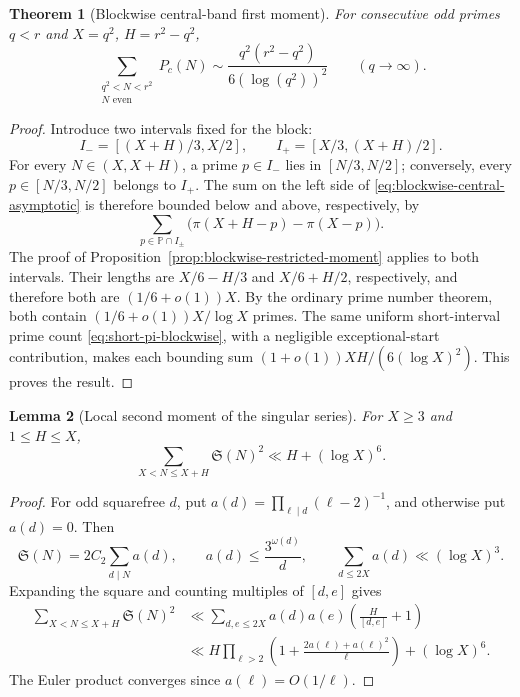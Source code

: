 \documentclass[final,11pt]{elsarticle}
\newtheorem{theorem}{Theorem}[section]
\newtheorem{lemma}[theorem]{Lemma}
\theoremstyle{definition}
\theoremstyle{remark}
\newcommand{\PP}{\mathbb{P}}
\newcommand{\Sg}{\mathfrak{S}}
\numberwithin{equation}{section}
\begin{document}
\begin{theorem}[Blockwise central-band first moment]
\label{thm:blockwise-central-moment}
For consecutive odd primes $q<r$ and $X=q^2$, $H=r^2-q^2$,
\begin{equation}\label{eq:blockwise-central-asymptotic}
 \boxed{\displaystyle
 \sum_{\substack{q^2<N<r^2\\N\text{ even}}}P_c(N)
 \sim\frac{q^2(r^2-q^2)}{6(\log(q^2))^2}}
 \qquad(q\to\infty).
\end{equation}
\end{theorem}
\begin{proof}
Introduce two intervals fixed for the block:
\[
 I_-=[(X+H)/3,X/2],\qquad
 I_+=[X/3,(X+H)/2].
\]
For every $N\in(X,X+H)$, a prime $p\in I_-$ lies in
$[N/3,N/2]$; conversely, every $p\in[N/3,N/2]$ belongs to $I_+$.
The sum on the left side of \eqref{eq:blockwise-central-asymptotic}
is therefore bounded below and above, respectively, by
\[
 \sum_{p\in\PP\cap I_\pm}
   \bigl(\pi(X+H-p)-\pi(X-p)\bigr).
\]
The proof of Proposition~\ref{prop:blockwise-restricted-moment}
applies to both intervals.  Their lengths are
$X/6-H/3$ and $X/6+H/2$, respectively, and therefore both are
$(1/6+o(1))X$.  By the ordinary prime number theorem, both contain
$(1/6+o(1))X/\log X$ primes.  The same uniform short-interval
prime count \eqref{eq:short-pi-blockwise}, with a negligible
exceptional-start contribution, makes each bounding sum
$(1+o(1))XH/(6(\log X)^2)$.  This proves the result.
\end{proof}

\begin{lemma}[Local second moment of the singular series]
\label{lem:short-singular-second}
For $X\ge3$ and $1\le H\le X$,
\[
 \sum_{X<N\le X+H}\Sg(N)^2\ll H+(\log X)^6.
\]
\end{lemma}
\begin{proof}
For odd squarefree $d$, put
$a(d)=\prod_{\ell\mid d}(\ell-2)^{-1}$, and otherwise put $a(d)=0$.
Then
\[
 \Sg(N)=2C_2\sum_{d\mid N}a(d),\qquad
 a(d)\le\frac{3^{\omega(d)}}d,
 \qquad\sum_{d\le2X}a(d)\ll(\log X)^3.
\]
Expanding the square and counting multiples of $[d,e]$ gives
\begin{align*}
 \sum_{X<N\le X+H}\Sg(N)^2
 &\ll \sum_{d,e\le2X}a(d)a(e)
            \left(\frac{H}{[d,e]}+1\right)\\
 &\ll H\prod_{\ell>2}
          \left(1+\frac{2a(\ell)+a(\ell)^2}{\ell}\right)
       +(\log X)^6.
\end{align*}
The Euler product converges since $a(\ell)=O(1/\ell)$.
\end{proof}
\end{document}
